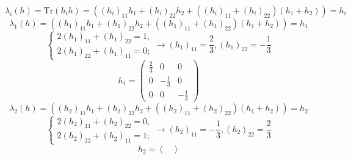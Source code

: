 \documentclass[12pt]{article}
\theoremstyle{definition}
\begin{document}
\begin{enumerate}
\begin{itemize}
        \begin{equation}
            \lambda_i(h)=\text{Tr}(h_ih)=((h_i)_{11}h_1+(h_i)_{22}h_2+((h_i)_{11}+(h_i)_{22})(h_1+h_2))=h_i
        \end{equation}
        \begin{equation}
            \lambda_1(h)=((h_1)_{11}h_1+(h_1)_{22}h_2+((h_1)_{11}+(h_1)_{22})(h_1+h_2))=h_1
        \end{equation}
        \begin{equation}
            \begin{cases}
                2(h_1)_{11}+(h_{1})_{22}=1,\\
                2(h_1)_{22}+(h_{1})_{11}=0;
            \end{cases}\rightarrow (h_1)_{11}=\frac{2}{3}, (h_1)_{22}=-\frac{1}{3}
        \end{equation}
        \begin{equation}
            h_1=\begin{pmatrix}
                \frac{2}{3} & 0 & 0\\
                0 & -\frac{1}{3} & 0\\
                0 & 0 & -\frac{1}{3}
            \end{pmatrix}
        \end{equation}
        \begin{equation}
            \lambda_2(h)=((h_2)_{11}h_1+(h_2)_{22}h_2+((h_2)_{11}+(h_2)_{22})(h_1+h_2))=h_2
        \end{equation}
        \begin{equation}
            \begin{cases}
                2(h_2)_{11}+(h_2)_{22}=0,\\
                2(h_2)_{22}+(h_2)_{11}=1;
            \end{cases}\rightarrow (h_2)_{11}=-\frac{1}{3}, (h_2)_{22}=\frac{2}{3}
        \end{equation}
        \begin{equation}
            h_2=\begin{pmatrix}

\end{pmatrix}
\end{equation}
\end{itemize}
\end{enumerate}
\end{document}
